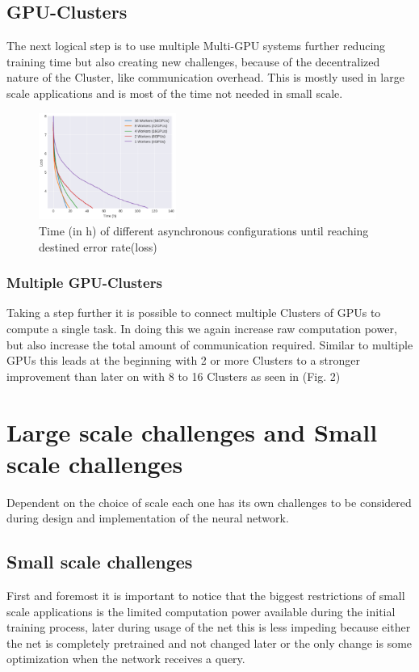 \documentclass[conference]{IEEEtran}
\begin{document}
\subsection{GPU-Clusters}

The next logical step is to use multiple Multi-GPU systems further reducing training time but also creating new challenges, because of the decentralized nature of the Cluster, like communication overhead.  This is mostly used in large scale applications and is most of the time not needed in small scale.

\begin{figure}
\centering
\includegraphics[width=0.4\textwidth]{gpu_cluster_perf_win.png}
\caption{Time (in h) of different asynchronous configurations until reaching destined error rate(loss)\cite{sastre2017scalability}}
\label{fig_cl_gpus}
\end{figure}


\subsubsection{Multiple GPU-Clusters}
Taking a step further it is possible to connect multiple Clusters of GPUs to compute a single task. In doing this we again increase raw computation power, but also increase the total amount of communication required. Similar to multiple GPUs this leads at the beginning with 2 or more Clusters to a stronger improvement than later on with 8 to 16 Clusters as seen in (Fig. 2)




\section{Large scale challenges and Small scale challenges}
Dependent on the choice of scale each one has its own challenges to be considered during design and implementation of the neural network.

\subsection{Small scale challenges}
First and foremost it is important to notice that the biggest restrictions of small scale applications is the limited computation power available during the initial training process, later during usage of the net this is less impeding because either the net is completely pretrained and not changed later or the only change is some optimization when the network receives a query.
\end{document}
